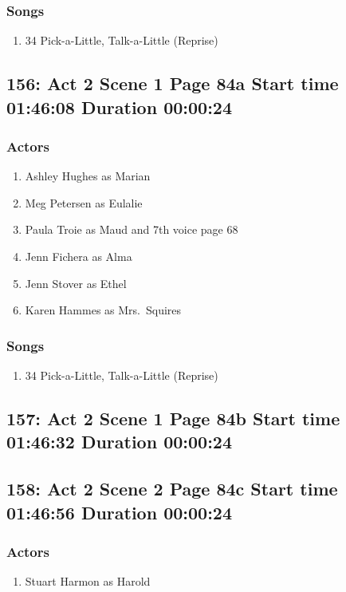 \subsubsection{Songs}
\begin{enumerate}
\item 34 Pick-a-Little, Talk-a-Little (Reprise)
\end{enumerate}
\subsection{156: Act 2 Scene 1 Page 84a Start time 01:46:08 Duration 00:00:24}

\subsubsection{Actors}
\begin{enumerate}
\item Ashley Hughes as Marian
\item Meg Petersen as Eulalie
\item Paula Troie as Maud and 7th voice page 68
\item Jenn Fichera as Alma
\item Jenn Stover as Ethel
\item Karen Hammes as Mrs.~Squires
\end{enumerate}

\subsubsection{Songs}
\begin{enumerate}
\item 34 Pick-a-Little, Talk-a-Little (Reprise)
\end{enumerate}
\subsection{157: Act 2 Scene 1 Page 84b Start time 01:46:32 Duration 00:00:24}

\subsection{158: Act 2 Scene 2 Page 84c Start time 01:46:56 Duration 00:00:24}

\subsubsection{Actors}
\begin{enumerate}
\item Stuart Harmon as Harold
\end{enumerate}
